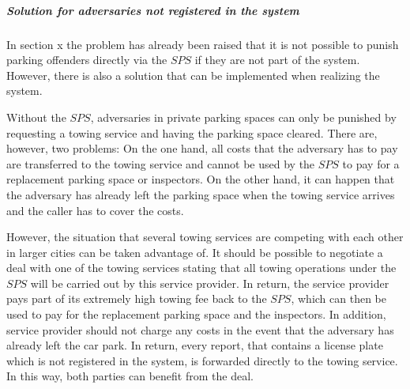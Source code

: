 \subparagraph{Solution for adversaries not registered in the system}
In section x the problem has already been raised that it is not possible to punish parking offenders directly via the $SPS$ if they are not part of the system. However, there is also a solution that can be implemented when realizing the system.

Without the $SPS$, adversaries in private parking spaces can only be punished by requesting a towing service and having the parking space cleared. There are, however, two problems: On the one hand, all costs that the adversary has to pay are transferred to the towing service and cannot be used by the $SPS$ to pay for a replacement parking space or inspectors. On the other hand, it can happen that the adversary has already left the parking space when the towing service arrives and the caller has to cover the costs.

However, the situation that several towing services are competing with each other in larger cities can be taken advantage of. It should be possible to negotiate a deal with one of the towing services stating that all towing operations under the $SPS$ will be carried out by this service provider. In return, the service provider pays part of its extremely high towing fee back to the $SPS$, which can then be used to pay for the replacement parking space and the inspectors. In addition, service provider should not charge any costs in the event that the adversary has already left the car park. In return, every report, that contains a license plate which is not registered in the system, is forwarded directly to the towing service. In this way, both parties can benefit from the deal.